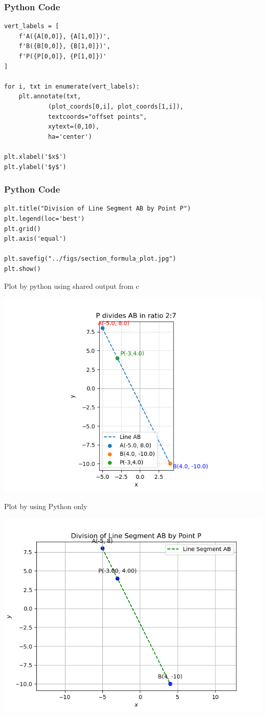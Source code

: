 \documentclass{beamer}
\begin{document}
\begin{frame}[fragile]
    \frametitle{Python Code}
    \begin{lstlisting}
vert_labels = [
    f'A({A[0,0]}, {A[1,0]})',
    f'B({B[0,0]}, {B[1,0]})',
    f'P({P[0,0]}, {P[1,0]})'
]

for i, txt in enumerate(vert_labels):
    plt.annotate(txt,
            (plot_coords[0,i], plot_coords[1,i]),
            textcoords="offset points",
            xytext=(0,10),
            ha='center')

plt.xlabel('$x$')
plt.ylabel('$y$')
\end{lstlisting}
\end{frame}
\begin{frame}[fragile]
    \frametitle{Python Code}
    \begin{lstlisting}
plt.title("Division of Line Segment AB by Point P")
plt.legend(loc='best')
plt.grid()
plt.axis('equal')

plt.savefig("../figs/section_formula_plot.jpg")
plt.show()

\end{lstlisting}
\end{frame}
\begin{frame}{Plot by python using shared output from c}
	\begin{center}
		\includegraphics[width=0.9\columnwidth]{figs/Figure.png}
	\end{center}
\end{frame}
\begin{frame}{Plot by using Python only}
	\begin{center}
		\includegraphics[width=0.9\columnwidth]{figs/Figure_1.png}
	\end{center}
\end{frame}
\end{document}
